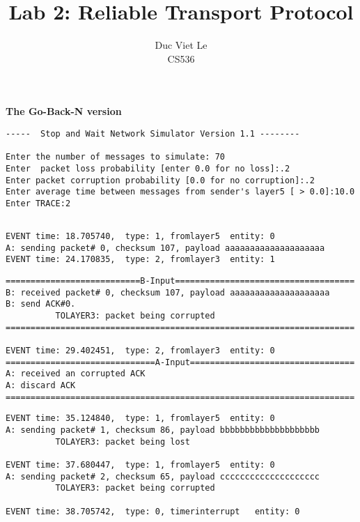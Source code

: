 \documentclass[12pt]{article}
\begin{document}
 
\title{Lab 2: Reliable Transport Protocol}
\author{Duc Viet Le\\ 
CS536}
 
\maketitle
\noindent
\large{\textbf{The Go-Back-N version}}
\normalsize

\begin{Verbatim}[frame=single, rulecolor=\color{green}, label=Input] 
-----  Stop and Wait Network Simulator Version 1.1 -------- 

Enter the number of messages to simulate: 70
Enter  packet loss probability [enter 0.0 for no loss]:.2
Enter packet corruption probability [0.0 for no corruption]:.2
Enter average time between messages from sender's layer5 [ > 0.0]:10.0
Enter TRACE:2
\end{Verbatim}
\begin{verbatim}

EVENT time: 18.705740,  type: 1, fromlayer5  entity: 0
A: sending packet# 0, checksum 107, payload aaaaaaaaaaaaaaaaaaaa
EVENT time: 24.170835,  type: 2, fromlayer3  entity: 1
\end{verbatim}
\begin{Verbatim}[frame=single, rulecolor=\color{blue}, label=Handle corruption] 
===========================B-Input====================================
B: received packet# 0, checksum 107, payload aaaaaaaaaaaaaaaaaaaa
B: send ACK#0.
          TOLAYER3: packet being corrupted
======================================================================

EVENT time: 29.402451,  type: 2, fromlayer3  entity: 0
==============================A-Input=================================
A: received an corrupted ACK 
A: discard ACK
======================================================================
\end{Verbatim}
\begin{verbatim}
EVENT time: 35.124840,  type: 1, fromlayer5  entity: 0
A: sending packet# 1, checksum 86, payload bbbbbbbbbbbbbbbbbbbb
          TOLAYER3: packet being lost

EVENT time: 37.680447,  type: 1, fromlayer5  entity: 0
A: sending packet# 2, checksum 65, payload cccccccccccccccccccc
          TOLAYER3: packet being corrupted

EVENT time: 38.705742,  type: 0, timerinterrupt   entity: 0	
\end{verbatim}
\end{document}
